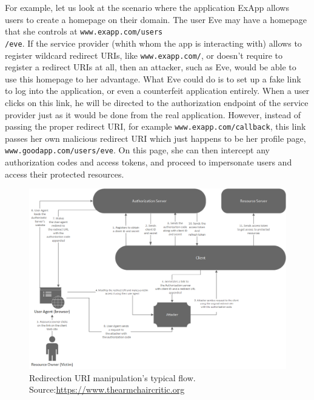 For example, let us look at the scenario where the application ExApp allows users to create a homepage on their domain. The user Eve may have a homepage that she controls at \texttt{www.exapp.com/users \\ /eve}. If the service provider (whith whom the app is interacting with) allows to register wildcard redirect URIs, like \texttt{www.exapp.com/\*}, or doesn't require to register a redirect URIs at all, then an attacker, such as Eve, would be able to use this homepage to her advantage.
What Eve could do is to set up a fake link to log into the application, or even a counterfeit application entirely. When a user clicks on this link, he will be directed to the authorization endpoint of the service provider just as it would be done from the real application. However, instead of passing the proper redirect URI, for example \texttt{www.exapp.com/callback}, this link passes her own malicious redirect URI which just happens to be her profile page, \texttt{www.goodapp.com/users/eve}. On this page, she can then intercept any authorization codes and access tokens, and proceed to impersonate users and access their protected resources.

\begin{figure}[ht]
    \centering
    \includegraphics[scale=0.63]{chapters/images/chp4/authCodeURIAttack.png}
    \caption[Redirection URI manipulation's typical flow]{Redirection URI manipulation's typical flow.\\Source:\hspace{0.2cm}\url{https://www.thearmchaircritic.org}}
    \label{fig:reduri}
\end{figure}

